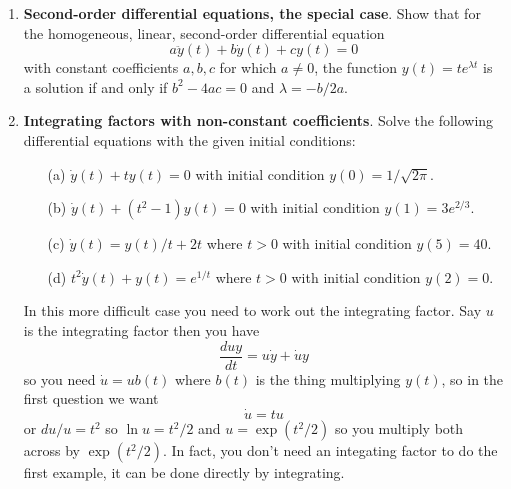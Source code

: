 \documentclass[11pt,a4paper]{scrartcl}
\begin{document}
\begin{enumerate}
\item \textbf{Second-order differential equations, the special case}.
	Show that for the homogeneous, linear, second-order differential equation
	\[a\ddot{y}(t) + b\dot{y}(t) + cy(t) = 0\]
	with constant coefficients $a,b,c$ for which $a \neq 0$, the
	function $y(t) = te^{\lambda t}$ is a solution if and only if
	$b^2 - 4ac = 0$ and $\lambda = -b/2a$.

	\item \textbf{Integrating factors with non-constant coefficients}.
	Solve the following differential equations with the given initial conditions:
	\begin{itemize}
		\item[(a)] $\dot{y}(t) + ty(t) = 0$ with initial condition $y(0) = 1/\sqrt{2\pi}$.
		\item[(b)] $\dot{y}(t) + (t^2-1)y(t) = 0$ with initial condition $y(1) = 3e^{2/3}$.
		\item[(c)] $\dot{y}(t) = y(t)/t + 2t$ where $t > 0$ with initial condition $y(5) = 40$.
		\item[(d)] $t^2\dot{y}(t) + y(t) = e^{1/t}$ where $t>0$ with initial condition $y(2) = 0$.
	\end{itemize}
        In this more difficult case you need to work out the integrating factor. Say $u$ is the integrating factor then you have
        \begin{equation}
          \frac{duy}{dt}=u\dot{y}+\dot{u}y
        \end{equation}
        so you need $\dot{u}=ub(t)$ where $b(t)$ is the thing multiplying $y(t)$, so in the first question we want
        \begin{equation}
          \dot{u}=tu
        \end{equation}
        or $du/u=t^2$ so $\ln{u}=t^2/2$ and $u=\exp{(t^2/2)}$ so you
        multiply both across by $\exp{(t^2/2)}$. In fact, you don't
        need an integating factor to do the first example, it can be
        done directly by integrating.

          
        
\end{enumerate}
\end{document}
